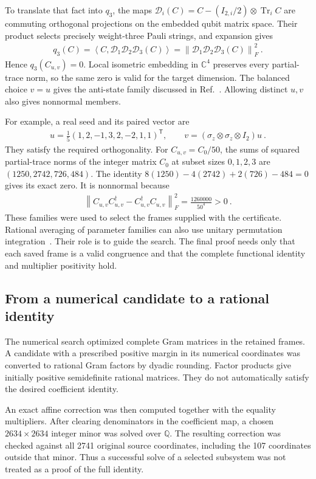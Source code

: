 \documentclass[aps,pra,reprint,superscriptaddress,amsmath,amssymb,floatfix,nofootinbib]{revtex4-2}
\newcommand{\Tr}{\operatorname{Tr}}
\newcommand{\norm}[1]{\left\lVert#1\right\rVert}
\newcommand{\ip}[2]{\left\langle#1,#2\right\rangle}
\newcommand{\C}{\mathbb C}
\newcommand{\Q}{\mathbb Q}
\begin{document}
To translate that fact into $q_3$, the maps
$\mathcal D_i(C)=C-(I_{2,i}/2)\otimes\Tr_iC$ are commuting
orthogonal projections on the embedded qubit matrix space.
Their product selects precisely weight-three Pauli strings, and expansion
gives
\begin{align}
 q_3(C)=\ip C{\mathcal D_1\mathcal D_2\mathcal D_3(C)}
       =\norm{\mathcal D_1\mathcal D_2\mathcal D_3(C)}_F^2\ .
\end{align}
Hence $q_3(C_{u,v})=0$.
Local isometric embedding in $\C^4$ preserves every partial-trace norm,
so the same zero is valid for the target dimension.
The balanced choice $v=u$ gives the anti-state family discussed in
Ref.~\cite{WZ}. Allowing distinct $u,v$ also gives nonnormal members.

For example, a real seed and its paired vector are
\begin{align}
 u=\frac15(1,2,-1,3,2,-2,1,1)^{\mathsf T},
 \qquad v=(\sigma_z\otimes\sigma_z\otimes I_2)u\ .
 \label{eq:crossed-seed}
\end{align}
They satisfy the required orthogonality.
For $C_{u,v}=C_0/50$, the sums of squared partial-trace norms of the
integer matrix $C_0$ at subset sizes $0,1,2,3$ are
$(1250,2742,726,484)$.
The identity $8(1250)-4(2742)+2(726)-484=0$ gives its exact zero.
It is nonnormal because
\begin{align}
 \norm{C_{u,v}C_{u,v}^\dagger-C_{u,v}^\dagger C_{u,v}}_F^2
 =\frac{1260000}{50^4}>0\ .
\end{align}
These families were used to select the frames supplied with the
certificate. Rational averaging of parameter families can also use
unitary permutation integration~\cite{CollinsSniady}.
Their role is to guide the search. The final proof needs only that each
saved frame is a valid congruence and that the complete functional
identity and multiplier positivity hold.

\subsection{From a numerical candidate to a rational identity}

The numerical search optimized complete Gram matrices in the retained
frames. A candidate with a prescribed positive margin in its numerical
coordinates was converted to rational Gram factors by dyadic rounding.
Factor products give initially positive semidefinite rational matrices.
They do not automatically satisfy the desired coefficient identity.

An exact affine correction was then computed together with the equality
multipliers. After clearing denominators in the coefficient map, a chosen
$2634\times2634$ integer minor was solved over $\Q$.
The resulting correction was checked against all 2741 original source
coordinates, including the 107 coordinates outside that minor.
Thus a successful solve of a selected subsystem was not treated as a
proof of the full identity.
\end{document}
